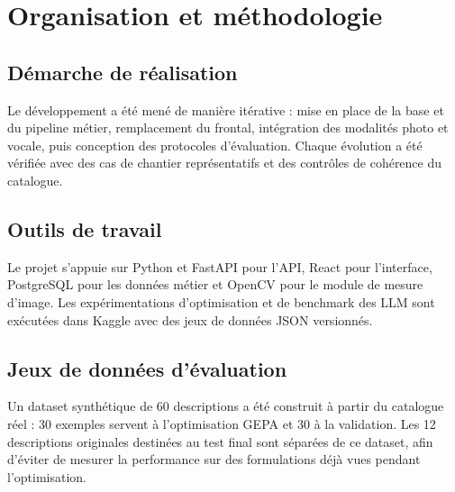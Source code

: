 \section{Organisation et méthodologie}
\subsection{Démarche de réalisation}
Le développement a été mené de manière itérative : mise en place de la base et du pipeline métier, remplacement du frontal, intégration des modalités photo et vocale, puis conception des protocoles d'évaluation. Chaque évolution a été vérifiée avec des cas de chantier représentatifs et des contrôles de cohérence du catalogue.

\subsection{Outils de travail}
Le projet s'appuie sur Python et FastAPI pour l'API, React pour l'interface, PostgreSQL pour les données métier et OpenCV pour le module de mesure d'image. Les expérimentations d'optimisation et de benchmark des LLM sont exécutées dans Kaggle avec des jeux de données JSON versionnés.

\subsection{Jeux de données d'évaluation}
Un dataset synthétique de 60 descriptions a été construit à partir du catalogue réel : 30 exemples servent à l'optimisation GEPA et 30 à la validation. Les 12 descriptions originales destinées au test final sont séparées de ce dataset, afin d'éviter de mesurer la performance sur des formulations déjà vues pendant l'optimisation.
